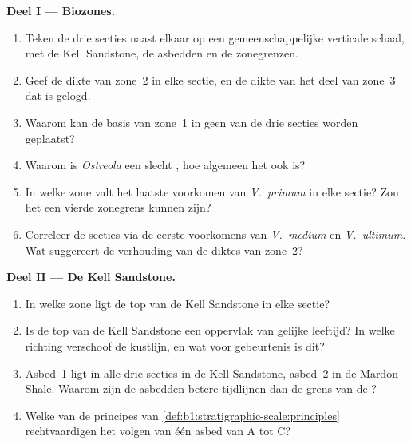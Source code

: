 \begin{problem}
\medskip
\noindent\textbf{Deel I --- Biozones.}
\begin{enumerate}
  \item Teken de drie secties naast elkaar op een gemeenschappelijke verticale schaal, met de Kell Sandstone, de asbedden en de zonegrenzen.
  \item Geef de dikte van zone~2 in elke sectie, en de dikte van het deel van zone~3 dat is gelogd.
  \item Waarom kan de basis van zone~1 in geen van de drie secties worden geplaatst?
  \item Waarom is \emph{Ostreola} een slecht , hoe algemeen het ook is?
  \item In welke zone valt het laatste voorkomen van \emph{V.~primum} in elke sectie? Zou het een vierde zonegrens kunnen zijn?
  \item Correleer de secties via de eerste voorkomens van \emph{V.~medium} en \emph{V.~ultimum}. Wat suggereert de verhouding van de diktes van zone~2?
\end{enumerate}

\noindent\textbf{Deel II --- De Kell Sandstone.}
\begin{enumerate}[resume]
  \item In welke zone ligt de top van de Kell Sandstone in elke sectie?
  \item Is de top van de Kell Sandstone een oppervlak van gelijke leeftijd? In welke richting verschoof de kustlijn, en wat voor gebeurtenis is dit?
  \item Asbed~1 ligt in alle drie secties in de Kell Sandstone, asbed~2 in de Mardon Shale. Waarom zijn de asbedden betere tijdlijnen dan de grens van de ?
  \item Welke van de principes van \cref{def:b1:stratigraphic-scale:principles} rechtvaardigen het volgen van één asbed van A tot C?
\end{enumerate}


\end{problem}
